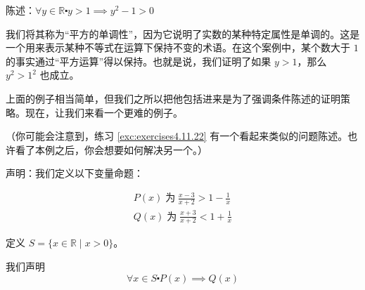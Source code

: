 \begin{example}[平方的单调性]

    陈述：$\forall y \in \mathbb{R} \centerdot y>1 \implies y^2-1>0$
\end{example}

\begin{center}
    \noindent {}
\end{center}

我们将其称为``平方的单调性''，因为它说明了实数的某种特定属性是单调的。这是一个用来表示某种不等式在运算下保持不变的术语。在这个案例中，某个数大于 $1$ 的事实通过``平方运算''得以保持。也就是说，我们证明了如果 $y > 1$，那么 $y^2 > 1^2$ 也成立。

上面的例子相当简单，但我们之所以把他包括进来是为了强调条件陈述的证明策略。现在，让我们来看一个更难的例子。

（你可能会注意到，练习 \ref{exc:exercises4.11.22} 有一个看起来类似的问题陈述。也许看了本例之后，你会想要如何解决另一个。）

\begin{example}[解决不等式问题]\label{ex:example4.9.8}

    声明：我们定义以下变量命题：

    \begin{align*}
        P(x) \;\text{为}\; \frac{x-3}{x+2}>1-\frac{1}{x} \\
        Q(x) \;\text{为}\; \frac{x+3}{x+2}<1+\frac{1}{x}
    \end{align*}

    定义 $S = \{x \in \mathbb{R} \mid x > 0\}$。

    我们声明
    \[\forall x \in S \centerdot P(x) \implies Q(x)\]
\end{example}

